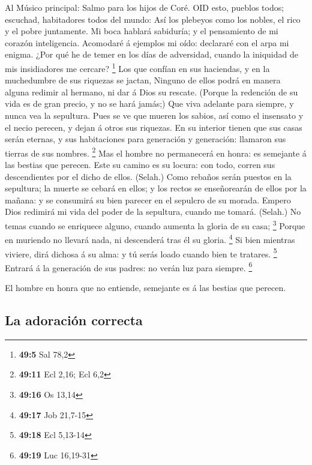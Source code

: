  Al Músico principal: Salmo para los hijos de Coré. OID
esto, pueblos todos; escuchad, habitadores todos del mundo: 
Así los plebeyos como los nobles, el rico y el pobre juntamente.
 Mi boca hablará sabiduría; y el pensamiento de mi corazón
inteligencia.  Acomodaré á ejemplos mi oído: declararé con
el arpa mi enigma.  ¿Por qué he de temer en los días de
adversidad, cuando la iniquidad de mis insidiadores me cercare?
\footnote{\textbf{49:5} Sal 78,2}  Los que confían en sus
haciendas, y en la muchedumbre de sus riquezas se jactan, 
Ninguno de ellos podrá en manera alguna redimir al hermano, ni dar á
Dios su rescate.  (Porque la redención de su vida es de gran
precio, y no se hará jamás;)  Que viva adelante para
siempre, y nunca vea la sepultura.  Pues se ve que mueren
los sabios, así como el insensato y el necio perecen, y dejan á otros
sus riquezas.  En su interior tienen que sus casas serán
eternas, y sus habitaciones para generación y generación: llamaron sus
tierras de sus nombres. \footnote{\textbf{49:11} Ecl 2,16; Ecl 6,2}
 Mas el hombre no permanecerá en honra: es semejante á las
bestias que perecen.  Este su camino es su locura: con
todo, corren sus descendientes por el dicho de ellos. (Selah.)
 Como rebaños serán puestos en la sepultura; la muerte se
cebará en ellos; y los rectos se enseñorearán de ellos por la mañana: y
se consumirá su bien parecer en el sepulcro de su morada. 
Empero Dios redimirá mi vida del poder de la sepultura, cuando me
tomará. (Selah.)  No temas cuando se enriquece alguno,
cuando aumenta la gloria de su casa; \footnote{\textbf{49:16} Os 13,14}
 Porque en muriendo no llevará nada, ni descenderá tras él
su gloria. \footnote{\textbf{49:17} Job 21,7-15}  Si bien
mientras viviere, dirá dichosa á su alma: y tú serás loado cuando bien
te tratares. \footnote{\textbf{49:18} Ecl 5,13-14}  Entrará
á la generación de sus padres: no verán luz para siempre. \footnote{\textbf{49:19}
  Luc 16,19-31}

 El hombre en honra que no entiende, semejante es á las
bestias que perecen.

\hypertarget{la-adoraciuxf3n-correcta}{%
\subsection{La adoración correcta}\label{la-adoraciuxf3n-correcta}}


